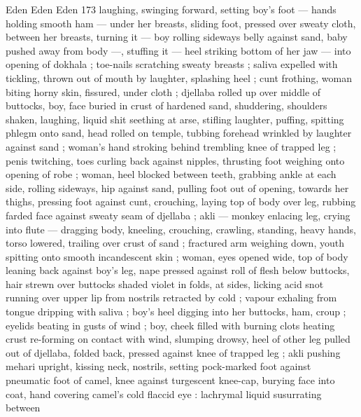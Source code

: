 Eden Eden Eden 173
laughing, swinging forward, setting boy's foot — hands holding
smooth ham — under her breasts, sliding foot, pressed over sweaty
cloth, between her breasts, turning it — boy rolling sideways belly
against sand, baby pushed away from body —, stuffing it — heel
striking bottom of her jaw — into opening of dokhala ; toe-nails
scratching sweaty breasts ; saliva expelled with tickling, thrown out
of mouth by laughter, splashing heel ; cunt frothing, woman biting
horny skin, fissured, under cloth ; djellaba rolled up over middle of
buttocks, boy, face buried in crust of hardened sand, shuddering,
shoulders shaken, laughing, liquid shit seething at arse, stifling
laughter, puffing, spitting phlegm onto sand, head rolled on temple,
tubbing forehead wrinkled by laughter against sand ; woman's hand
stroking behind trembling knee of trapped leg ; penis twitching, toes
curling back against nipples, thrusting foot weighing onto opening of
robe ; woman, heel blocked between teeth, grabbing ankle at each
side, rolling sideways, hip against sand, pulling foot out of opening,
towards her thighs, pressing foot against cunt, crouching, laying top
of body over leg, rubbing farded face against sweaty seam of
djellaba ; akli — monkey enlacing leg, crying into flute — dragging
body, kneeling, crouching, crawling, standing, heavy hands, torso
lowered, trailing over crust of sand ; fractured arm weighing down,
youth spitting onto smooth incandescent skin ; woman, eyes opened
wide, top of body leaning back against boy's leg, nape pressed
against roll of flesh below buttocks, hair strewn over buttocks shaded
violet in folds, at sides, licking acid snot running over upper lip from
nostrils retracted by cold ; vapour exhaling from tongue dripping with
saliva ; boy's heel digging into her buttocks, ham, croup ; eyelids
beating in gusts of wind ; boy, cheek filled with burning clots heating
crust re-forming on contact with wind, slumping drowsy, heel of other
leg pulled out of djellaba, folded back, pressed against knee of
trapped leg ; akli pushing mehari upright, kissing neck, nostrils,
setting pock-marked foot against pneumatic foot of camel, knee
against turgescent knee-cap, burying face into coat, hand covering
camel's cold flaccid eye : lachrymal liquid susurrating between

